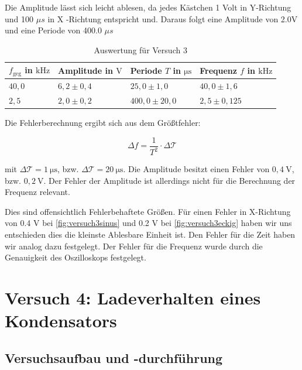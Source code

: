         Die Amplitude lässt sich leicht ablesen, da jedes Kästchen 1 Volt in Y-Richtung und 100 $\mu s$ in X -Richtung entspricht und. Daraus folgt eine Amplitude von 2.0V und eine Periode von 400.0 $\mu s$
        
        \begin{table}[H]
            \centering
            \begin{tabular}{|l|l|l|l|}
                \hline
                $f_{\mathrm{geg}}$ in $\mathrm{kHz}$ & Amplitude in $\mathrm{V}$ & Periode $T$ in $\mathrm{\mu s}$ & Frequenz $f$ in $\mathrm{kHz}$\\
                \hline\hline
                $40,0$ & $6,2 \pm 0,4$ & $25,0 \pm 1,0$ & $40,0 \pm 1,6$\\
                \hline
                $2,5$ & $2,0 \pm 0,2$ & $400,0 \pm 20,0$ & $2,5 \pm 0,125$\\
                \hline
            \end{tabular}
            \caption{Auswertung für Versuch 3}
            \label{tab:versuch3}
        \end{table}

        Die Fehlerberechnung ergibt sich aus dem Größtfehler:

        \begin{equation}
            \Delta f = \frac{1}{T^2} \cdot \Delta \mathcal{T}
            \label{eq:größtfehler}
        \end{equation}

        mit $\Delta \mathcal{T} = 1\ \mathrm{\mu s}$, bzw. $\Delta \mathcal{T} = 20\ \mathrm{\mu s}$. Die Amplitude besitzt einen Fehler von $0,4\ \mathrm{V}$, bzw. $0,2\ \mathrm{V}$. Der Fehler der Amplitude ist allerdings nicht für die Berechnung der Frequenz relevant.

        Dies sind offensichtlich Fehlerbehaftete Größen. Für einen Fehler in X-Richtung von 0.4 V bei \ref{fig:versuch3sinus} und 0.2 V bei \ref{fig:versuch3eckig} haben wir uns entschieden dies die kleinste Ablesbare Einheit ist. Den Fehler für die Zeit haben wir analog dazu festgelegt. Der Fehler für die Frequenz wurde durch die Genauigkeit des Oszilloskops festgelegt.

\section{Versuch 4: Ladeverhalten eines Kondensators}

    \subsection{Versuchsaufbau und -durchführung}

